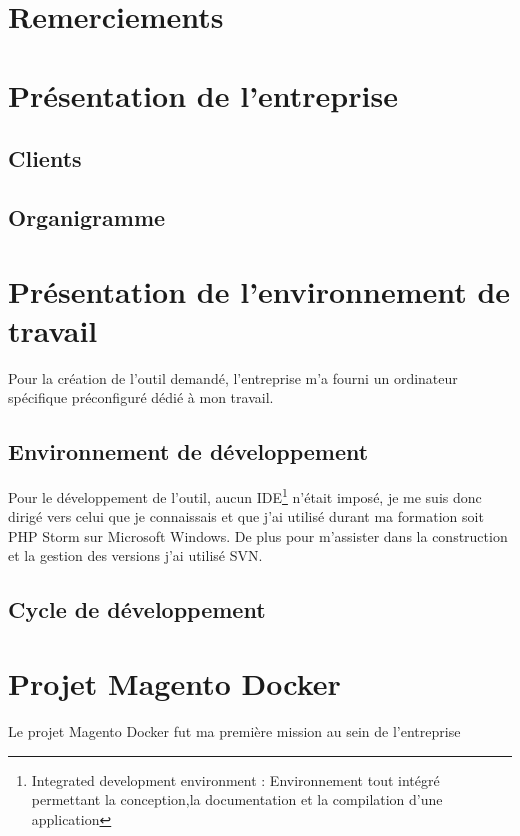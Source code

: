 \documentclass{Article}
\begin{document}
\clearpage
\newpage\null\thispagestyle{empty}\newpage

\tableofcontents

\section{Remerciements}
\section{Présentation de l'entreprise}
	\subsection{Clients}
	\subsection{Organigramme}
\section{Présentation de l'environnement de travail}

	Pour la création de l'outil demandé, l'entreprise m'a fourni un ordinateur spécifique préconfiguré
dédié à mon travail.

	\subsection{Environnement de développement}

	Pour le développement de l'outil, aucun IDE\footnote{Integrated development environment : Environnement tout intégré permettant la conception,la documentation et la compilation d'une application} n'était imposé, je me suis donc dirigé vers celui que je connaissais et que j'ai utilisé durant ma formation soit PHP Storm sur Microsoft Windows. De plus pour m'assister dans la construction et la gestion des versions j'ai utilisé SVN.

	\subsection{Cycle de développement}


\section{Projet Magento Docker}

	Le projet Magento Docker fut ma première mission au sein de l'entreprise
\end{document}
